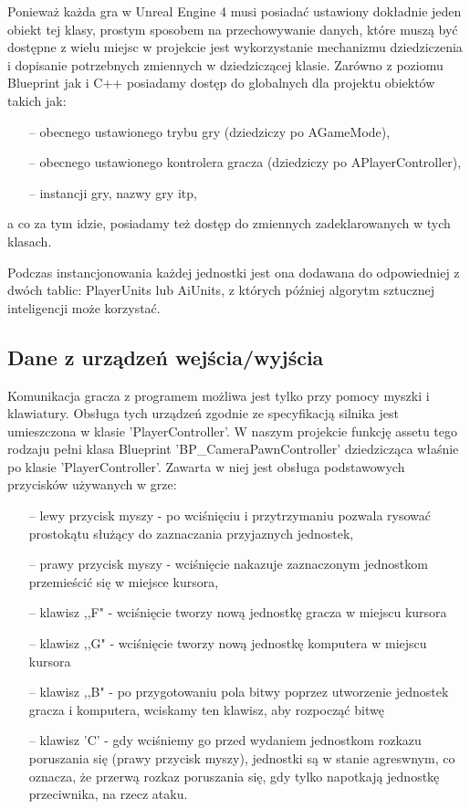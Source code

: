 \documentclass[12pt]{report}
\begin{document}
Ponieważ każda gra w Unreal Engine 4 musi posiadać ustawiony dokładnie jeden obiekt tej klasy, prostym sposobem na przechowywanie danych, które muszą być dostępne z wielu miejsc w projekcie jest wykorzystanie mechanizmu dziedziczenia i dopisanie potrzebnych zmiennych w dziedziczącej klasie. Zarówno z poziomu Blueprint jak i C++ posiadamy dostęp do globalnych dla projektu obiektów takich jak: 
\begin{itemize}
\item[--] obecnego ustawionego trybu gry (dziedziczy po AGameMode),
\item[--] obecnego ustawionego kontrolera gracza (dziedziczy po APlayerController),
\item[--] instancji gry, nazwy gry itp,
\end{itemize}
a co za tym idzie, posiadamy też dostęp do zmiennych zadeklarowanych w tych klasach. 

Podczas instancjonowania każdej jednostki jest ona dodawana do odpowiedniej z dwóch tablic: PlayerUnits lub AiUnits, z których później algorytm sztucznej inteligencji może korzystać.

\subsection{Dane z urządzeń wejścia/wyjścia}
Komunikacja gracza z programem możliwa jest tylko przy pomocy myszki i klawiatury. Obsługa tych urządzeń zgodnie ze specyfikacją silnika jest umieszczona w klasie 'PlayerController'. W naszym projekcie funkcję assetu tego rodzaju pełni klasa Blueprint 'BP\_CameraPawnController' dziedzicząca właśnie po klasie 'PlayerController'. Zawarta w niej jest obsługa podstawowych przycisków używanych w grze: 

\begin{itemize}
\item[--] lewy przycisk myszy - po wciśnięciu i przytrzymaniu pozwala rysować prostokątu służący do zaznaczania przyjaznych jednostek,
\item[--] prawy przycisk myszy - wciśnięcie nakazuje zaznaczonym jednostkom przemieścić się w miejsce kursora,
\item[--] klawisz ,,F" - wciśnięcie tworzy nową jednostkę gracza w miejscu kursora
\item[--] klawisz ,,G" - wciśnięcie tworzy nową jednostkę komputera w miejscu kursora
\item[--] klawisz ,,B" - po przygotowaniu pola bitwy poprzez utworzenie jednostek gracza i komputera, wciskamy ten klawisz, aby rozpocząć bitwę
\item[--] klawisz 'C' - gdy wciśniemy go przed wydaniem jednostkom rozkazu poruszania się (prawy przycisk myszy), jednostki są w stanie agreswnym, co oznacza, że przerwą rozkaz poruszania się, gdy tylko napotkają jednostkę przeciwnika, na rzecz ataku.
\end{itemize}
\end{document}
